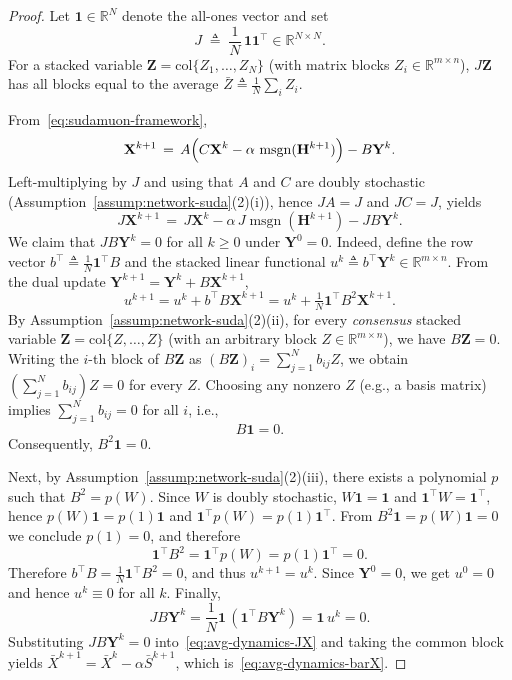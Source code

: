 \documentclass{article}
\begin{document}
\begin{proof}
Let $\mathbf{1}\in\mathbb{R}^N$ denote the all-ones vector and set
\[
    J \;\triangleq\; \frac{1}{N}\,\mathbf{1}\mathbf{1}^\top \in\mathbb{R}^{N\times N}.
\]
For a stacked variable $\mathbf{Z}=\mathrm{col}\{Z_1,\dots,Z_N\}$ (with matrix blocks $Z_i\in\mathbb{R}^{m\times n}$),
$J\mathbf{Z}$ has all blocks equal to the average $\bar Z\triangleq\frac{1}{N}\sum_i Z_i$.

From~\eqref{eq:sudamuon-framework},
\[
    \mathbf{X}^{k+1} \,=\, A\Bigl(C\mathbf{X}^{k} - \alpha\,\operatorname{msgn}(\mathbf{H}^{k+1})\Bigr) - B\mathbf{Y}^{k}.
\]
Left-multiplying by $J$ and using that $A$ and $C$ are doubly stochastic (Assumption~\ref{assump:network-suda}(2)(i)), hence $JA=J$ and $JC=J$, yields
\begin{equation}
\label{eq:avg-dynamics-JX}
    J\mathbf{X}^{k+1} \,=\, J\mathbf{X}^{k} - \alpha\,J\operatorname{msgn}(\mathbf{H}^{k+1}) - JB\mathbf{Y}^{k}.
\end{equation}
We claim that $JB\mathbf{Y}^k=0$ for all $k\ge 0$ under $\mathbf Y^0=0$.
Indeed, define the row vector $b^\top\triangleq \tfrac{1}{N}\mathbf 1^\top B$ and the stacked linear functional
$u^k\triangleq b^\top \mathbf Y^k\in\mathbb{R}^{m\times n}$.
From the dual update $\mathbf Y^{k+1}=\mathbf Y^k + B\mathbf X^{k+1}$,
\[
    u^{k+1}=u^k + b^\top B\mathbf X^{k+1} = u^k + \tfrac{1}{N}\mathbf 1^\top B^2\mathbf X^{k+1}.
\]
By Assumption~\ref{assump:network-suda}(2)(ii), for every \emph{consensus} stacked variable
$\mathbf Z=\mathrm{col}\{Z,\dots,Z\}$ (with an arbitrary block $Z\in\mathbb R^{m\times n}$), we have $B\mathbf Z=0$.
Writing the $i$-th block of $B\mathbf Z$ as $(B\mathbf Z)_i=\sum_{j=1}^N b_{ij}Z$, we obtain
$(\sum_{j=1}^N b_{ij})Z=0$ for every $Z$.
Choosing any nonzero $Z$ (e.g., a basis matrix) implies $\sum_{j=1}^N b_{ij}=0$ for all $i$, i.e.,
\begin{equation}
\label{eq:avg-dynamics-B1}
B\mathbf 1=0.
\end{equation}
Consequently, $B^2\mathbf 1=0$.

Next, by Assumption~\ref{assump:network-suda}(2)(iii), there exists a polynomial $p$ such that $B^2=p(W)$.
Since $W$ is doubly stochastic, $W\mathbf 1=\mathbf 1$ and $\mathbf 1^\top W=\mathbf 1^\top$, hence
$p(W)\mathbf 1=p(1)\mathbf 1$ and $\mathbf 1^\top p(W)=p(1)\mathbf 1^\top$.
From $B^2\mathbf 1=p(W)\mathbf 1=0$ we conclude $p(1)=0$, and therefore
\begin{equation}
\label{eq:avg-dynamics-1TB2}
\mathbf 1^\top B^2=\mathbf 1^\top p(W)=p(1)\mathbf 1^\top=0.
\end{equation}
Therefore $b^\top B=\tfrac{1}{N}\mathbf 1^\top B^2=0$, and thus $u^{k+1}=u^k$.
Since $\mathbf Y^0=0$, we get $u^0=0$ and hence $u^k\equiv 0$ for all $k$.
Finally,
\[
JB\mathbf Y^k=\frac{1}{N}\mathbf 1\,(\mathbf 1^\top B\mathbf Y^k)=\mathbf 1\,u^k=0.
\]
Substituting $JB\mathbf Y^k=0$ into~\eqref{eq:avg-dynamics-JX} and taking the common block yields
$\bar X^{k+1}=\bar X^k-\alpha\bar S^{k+1}$, which is~\eqref{eq:avg-dynamics-barX}.
\end{proof}
\end{document}
